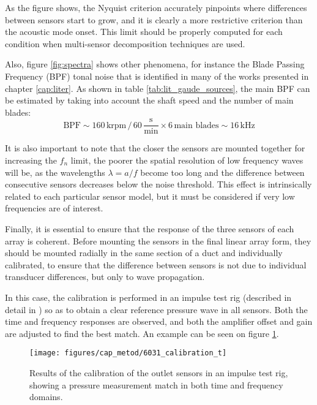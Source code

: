 As the figure shows, the Nyquist criterion accurately pinpoints where differences between sensors start to grow, and it is clearly a more restrictive criterion than the acoustic mode onset. This limit should be properly computed for each condition when multi-sensor decomposition techniques are used.

Also, figure \ref{fig:spectra} shows other phenomena, for instance the Blade Passing Frequency (BPF) tonal noise that is identified in many of the works presented in chapter \ref{cap:liter}. As shown in table \ref{tab:lit_gaude_sources}, the main BPF can be estimated by taking into account the shaft speed and the number of main blades:
\begin{equation}
  \text{BPF} \sim 160\,\text{krpm}\,/\,60\,\frac{\text{s}}{\text{min}} \times 6\,\text{main blades} \sim 16\,\text{kHz}
\end{equation}

It is also important to note that the closer the sensors are mounted together for increasing the $f_n$ limit, the poorer the spatial resolution of low frequency waves will be, as the wavelengths $\lambda=a/f$ become too long and the difference between consecutive sensors decreases below the noise threshold. This effect is intrinsically related to each particular sensor model, but it must be considered if very low frequencies are of interest.

Finally, it is essential to ensure that the response of the three sensors of each array is coherent. Before mounting the sensors in the final linear array form, they should be mounted radially in the same section of a duct and individually calibrated, to ensure that the difference between sensors is not due to individual transducer differences, but only to wave propagation.

In this case, the calibration is performed in an impulse test rig (described in detail in \cite{payri2000modified}) so as to obtain a clear reference pressure wave in all sensors. Both the time and frequency responses are observed, and both the amplifier offset and gain are adjusted to find the best match. An example can be seen on figure \ref{fig:6031_calibration}.

\begin{figure}[t!]
\centering
\texttt{[image: figures/cap\_metod/6031\_calibration\_t]}
\caption{Results of the calibration of the outlet sensors in an impulse test rig, showing a pressure measurement match in both time and frequency domains.}
\label{fig:6031_calibration}
\end{figure}

